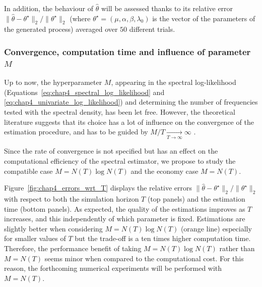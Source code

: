         In addition, the behaviour of $\hat \theta$ will be assessed thanks to its relative error ${\|\hat \theta - \theta^\star\|_2}/{\|\theta^\star\|_2}$
        (where $\theta^\star = (\mu, \alpha, \beta, \lambda_0)$ is the vector of the parameters of the generated process)
        averaged over $50$ different trials.



        
      \subsubsection{Convergence, computation time and influence of parameter $M$}
      
        Up to now, the hyperparameter $M$,
        appearing in the spectral log-likelihood (Equations~\eqref{eq:chap4_spectral_log_likelihood} and \eqref{eq:chap4_univariate_log_likelihood})
        and determining the number of frequencies tested with the spectral density,
        has been let free.
        However, the theoretical literature suggests that its choice has a lot of influence on the convergence of the estimation procedure,
        and has to be guided by ${M}/{T} \xrightarrow[T \to \infty]{} \infty$ \parencite{Pham1996}.
        
        Since the rate of convergence is not specified but has an effect on the computational efficiency of the spectral estimator,
        we propose to study the compatible case $M = N(T) \log N(T)$
        and the economy case $M = N(T)$.
		 
        Figure~\ref{fig:chap4_errors_wrt_T} displays the relative errors $\|\hat \theta - \theta^\star\|_2 / \|\theta^\star\|_2$ with respect to both the simulation horizon $T$ (top panels) and the estimation time (bottom panels). 
		 As expected, the quality of the estimations improves as $T$ increases, and this independently of which parameter is fixed.
		 Estimations are slightly better when considering $M = N(T) \log N(T)$ (orange line) especially for smaller values of $T$ but the trade-off is a ten times higher computation time. 
          Therefore, the performance benefit of taking $M = N(T) \log N(T)$ rather than $M = N(T)$ seems minor when compared to the computational cost. For this reason, the forthcoming numerical experiments will be performed with $M = N(T)$.

